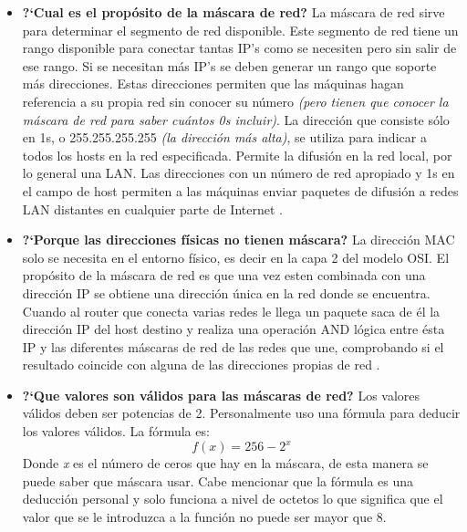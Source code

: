 {    \renewcommand{\labelitemi}{$\diamond$}
    \begin{itemize}
        \item \textbf{?`Cual es el prop\'osito de la m\'ascara de red?}
            \subitem La m\'ascara de red sirve para determinar el segmento de red disponible. Este segmento de red 
            tiene un rango disponible para conectar tantas IP's como se necesiten pero sin salir de ese rango. Si se 
            necesitan m\'as IP's se deben generar un rango que soporte m\'as direcciones. \newline
            Estas direcciones permiten que las m\'aquinas hagan referencia a su propia red sin conocer
            su n\'umero \textit{(pero tienen que conocer la m\'ascara de red para saber cu\'antos 0s incluir)}. La direcci\'on que
            consiste s\'olo en 1s, o 255.255.255.255 \textit{(la direcci\'on m\'as alta)}, se utiliza para indicar a todos los hosts
            en la red especificada. Permite la difusi\'on en la red local, por lo general una LAN. Las direcciones con
            un n\'umero de red apropiado y 1s en el campo de host permiten a las m\'aquinas enviar paquetes de
            difusi\'on a redes LAN distantes en cualquier parte de Internet \cite{Tanenbaum}. 

        \item \textbf{?`Porque las direcciones f\'isicas no tienen m\'ascara?}
            \subitem La direcci\'on MAC solo se necesita en el entorno f\'isico, es decir en la capa 2 del modelo OSI. El prop\'osito 
            de la m\'ascara de red es que una vez esten combinada con una direcci\'on IP se obtiene una direcci\'on \'unica en la red 
            donde se encuentra.\newline
            \newline
            Cuando al router que conecta varias redes le llega un paquete saca de \'el la dirección IP del host destino y realiza una 
            operaci\'on AND l\'ogica entre \'esta IP y las diferentes m\'ascaras de red de las redes que une, comprobando si el resultado 
            coincide con alguna de las direcciones propias de red \cite{Temas_para_la_educacion}. 
        \newpage

        \item \textbf{?`Que valores son v\'alidos para las m\'ascaras de red?}
            \subitem Los valores v\'alidos deben ser potencias de 2. Personalmente uso una f\'ormula para deducir los valores v\'alidos. 
            La f\'ormula es: 
            \begin{equation*}
                f(x) = 256 - 2^{x}  
            \end{equation*}
            Donde \textit{x} es el n\'umero de ceros que hay en la m\'ascara, de esta manera se puede saber que m\'ascara usar. Cabe mencionar 
            que la f\'ormula es una deducci\'on personal y solo funciona a nivel de octetos lo que significa que el valor que se le introduzca a 
            la funci\'on no puede ser mayor que 8.
        

\end{itemize}}
